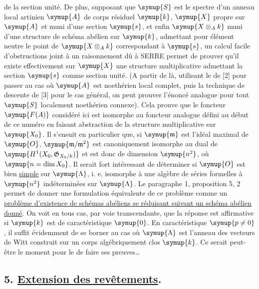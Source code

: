 de la section unité. De plus, supposant que $\symup{S}$ est le spectre d'un anneau
local artinien $\symup{A}$ de corps résiduel $\symup{k}$, $\symup{X}$ propre sur $\symup{A}$ et muni d'une
section $\symup{s}$, et enfin $\symup{X\otimes_Ak}$ muni d'une structure de schéma abélien sur
$\symup{k}$, admettant pour élément neutre le point de $\symup{X\otimes_Ak}$ correspondant à
$\symup{s}$, un calcul facile d'obstructions joint à un raisonnement dû à SERRE permet
de prouver qu'il existe effectivement sur $\symup{X}$ une structure multiplicative
admettant la section $\symup{s}$ comme section unité. (A partir de là, utilisant le
 de [2] pour passer au cas où $\symup{A}$ est noethérien local
complet, puis la technique de descente de [3] pour le cas général, on peut
prouver l'énoncé analogue pour tout $\symup{S}$ localement noethérien connexe). Cela
prouve que le foncteur $\symup{F(A)}$ considéré ici est isomorphe au foncteur analogue
défini au début de ce numéro en faisant abstraction de la structure
multiplicative sur $\symup{X_0}$. Il s'ensuit en particulier que, si $\symup{\mathfrak m}$ est
l'idéal maximal de $\symup{O}$, $\symup{\mathfrak m/\mathfrak m^2}$ est canoniquement
isomorphe au dual de $\symup{H^1(X_0,\mathfrak G_{X_0/k})}$ et est donc de dimension $\symup{n^2}$,
où $\symup{n=\dim X_0}$. Il serait fort intéressant de déterminer si $\symup{O}$ est bien
\uline{simple} sur $\symup{\Lambda}$, i. e. isomorphe à une algèbre de séries formelles à $\symup{n^2}$
indéterminées sur $\symup{\Lambda}$. Le paragraphe 1, proposition 5, 2 permet de donner
une formulation équivalente de ce problème comme un \uline{problème d'existence de
schémas abéliens se réduisant suivant un schéma abélien donné}. On voit en tous
cas, par voie transcendante, que la réponse est affirmative si $\symup{k}$ est de
caractéristique $\symup{0}$. En caractéristique $\symup{p\ne0}$, il suffit évidemment de se
borner au cas où $\symup{\Lambda}$ est l'anneau des vecteurs de Witt construit sur un
corps algébriquement clos $\symup{k}$. Ce serait peut-être le moment pour le  de faire ses preuves\ldots

\subsection*{\textnormal{5. \uline{Extension des revêtements}.}}

